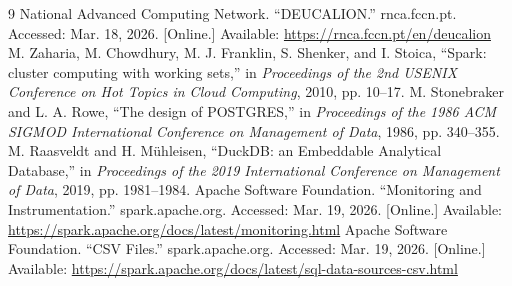 \documentclass[11pt, a4paper]{article}
\begin{document}
\begin{thebibliography}{9}
    \small
        National Advanced Computing Network.
        ``DEUCALION.''
        rnca.fccn.pt.
        Accessed: Mar. 18, 2026.
        [Online.] Available: \url{https://rnca.fccn.pt/en/deucalion}
        M. Zaharia, M. Chowdhury, M. J. Franklin, S. Shenker, and I. Stoica,
        ``Spark: cluster computing with working sets,''
        in \emph{Proceedings of the 2nd USENIX Conference on Hot Topics in Cloud Computing},
        2010, pp. 10--17.
        M. Stonebraker and L. A. Rowe,
        ``The design of POSTGRES,''
        in \emph{Proceedings of the 1986 ACM SIGMOD International Conference on Management of Data},
        1986, pp. 340--355.
        M. Raasveldt and H. Mühleisen,
        ``DuckDB: an Embeddable Analytical Database,''
        in \emph{Proceedings of the 2019 International Conference on Management of Data},
        2019, pp. 1981--1984.
        Apache Software Foundation.
        ``Monitoring and Instrumentation.''
        spark.apache.org.
        Accessed: Mar. 19, 2026.
        [Online.] Available: \url{https://spark.apache.org/docs/latest/monitoring.html}
        Apache Software Foundation.
        ``CSV Files.''
        spark.apache.org.
        Accessed: Mar. 19, 2026.
        [Online.] Available: \url{https://spark.apache.org/docs/latest/sql-data-sources-csv.html}
\end{thebibliography}
\end{document}
